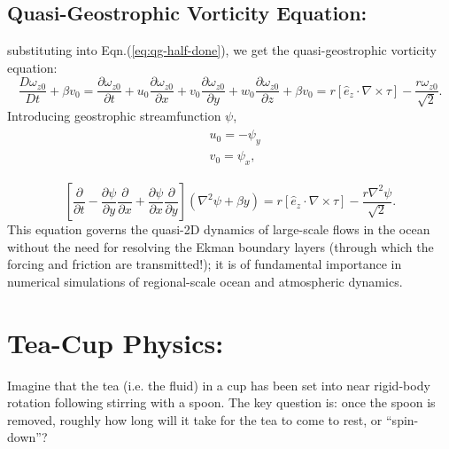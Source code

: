 \documentclass{article}
\newcommand{\pd}[2]{\frac{\partial{#1}}{\partial{#2}}}
\begin{document}
\subsection{Quasi-Geostrophic Vorticity Equation:}
substituting into Eqn.(\ref{eq:qg-half-done}), we get the quasi-geostrophic vorticity equation:
\begin{equation}\label{eq:qg-vort-eqn}
 \boxed{\frac{D\omega_{z0}}{Dt} + \beta v_{0} = \pd{\omega_{z0}}{t} + u_{0}\pd{\omega_{z0}}{x} + v_{0}\pd{\omega_{z0}}{y} + w_{0}\pd{\omega_{z0}}{z} + \beta v_{0} = r \left[\hat{e}_{z}\cdot\nabla \times \tau\right] -  \frac{r\omega_{z0}}{\sqrt{2}}  }.
\end{equation}
%
Introducing geostrophic streamfunction $\psi$, 
\begin{align}
 \begin{split}
  & u_{0} = -\psi_{y}\\
  & v_{0} = \psi_{x},
 \end{split}
\end{align}

\begin{equation}\label{eq:qg-vort-eqn-2}
 \boxed{\left[\pd{}{t} - \pd{\psi}{y}\pd{}{x} + \pd{\psi}{x}\pd{}{y}\right](\nabla^{2}\psi + \beta y) = r \left[\hat{e}_{z}\cdot\nabla \times \tau\right] -  \frac{r\nabla^{2}\psi}{\sqrt{2}}  }.
\end{equation}
%
This equation governs the quasi-2D dynamics of large-scale flows in the ocean without the need for resolving the Ekman boundary layers (through which the forcing and friction are transmitted!); it is of fundamental importance in numerical simulations of regional-scale ocean and atmospheric dynamics.
\section{Tea-Cup Physics:}
Imagine that the tea (i.e. the fluid) in a cup has been set into near rigid-body rotation following stirring with a spoon. The key question is: once the spoon is removed, roughly how long will it take for the tea to come to rest, or “spin-down”?
\end{document}
